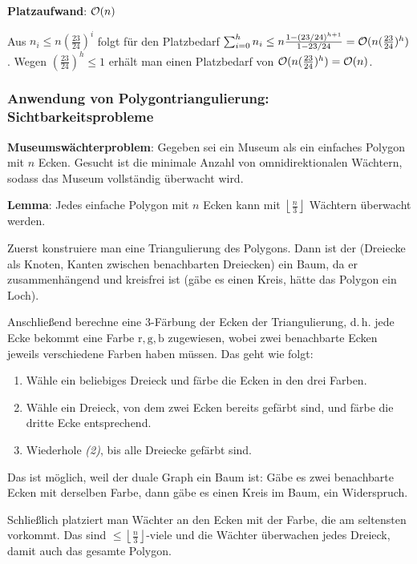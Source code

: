 \textbf{Platzaufwand}:
$\mathcal{O}(n)$

\begin{Beweis}
    Aus $n_i \le n (\frac{23}{24})^i$ folgt für den Platzbedarf
    $\sum_{i=0}^{h} n_i
    \le n \frac{1 - (23/24)^{h+1}}{1 - 23/24}
    = \mathcal{O}(n (\frac{23}{24})^h)$.
    Wegen $(\frac{23}{24})^h \le 1$
    erhält man einen Platzbedarf von $\mathcal{O}(n (\frac{23}{24})^h) = \mathcal{O}(n)$.
\end{Beweis}

\subsubsection{%
    Anwendung von Polygontriangulierung: Sichtbarkeitsprobleme%
}

\textbf{Museumswächterproblem}:
Gegeben sei ein Museum als ein einfaches Polygon mit $n$ Ecken.
Gesucht ist die minimale Anzahl von omnidirektionalen Wächtern, sodass das Museum vollständig
überwacht wird.

\textbf{Lemma}:
Jedes einfache Polygon mit $n$ Ecken kann mit
$\left\lfloor \frac{n}{3} \right\rfloor$ Wächtern überwacht werden.

\begin{Beweis}
    Zuerst konstruiere man eine Triangulierung des Polygons.
    Dann ist der 
    (Dreiecke als Knoten, Kanten zwischen benachbarten Dreiecken) ein Baum,
    da er zusammenhängend und kreisfrei ist
    (gäbe es einen Kreis, hätte das Polygon ein Loch).
    
    Anschließend berechne eine $3$-Färbung der Ecken der Triangulierung,
    d.\,h. jede Ecke bekommt eine Farbe $\text{r}, \text{g}, \text{b}$ zugewiesen,
    wobei zwei benachbarte Ecken jeweils verschiedene Farben haben müssen.
    Das geht wie folgt:
    \begin{enumerate}
        \item
        Wähle ein beliebiges Dreieck und färbe die Ecken in den drei Farben.
        
        \item
        Wähle ein Dreieck, von dem zwei Ecken bereits gefärbt sind, und färbe die dritte Ecke
        entsprechend.
        
        \item
        Wiederhole \emph{(2)}, bis alle Dreiecke gefärbt sind.
    \end{enumerate}
    Das ist möglich, weil der duale Graph ein Baum ist:
    Gäbe es zwei benachbarte Ecken mit derselben Farbe, dann gäbe es einen Kreis im Baum,
    ein Widerspruch.
    
    Schließlich platziert man Wächter an den Ecken mit der Farbe, die am seltensten vorkommt.
    Das sind $\le \left\lfloor \frac{n}{3} \right\rfloor$-viele und die Wächter überwachen
    jedes Dreieck, damit auch das gesamte Polygon.
\end{Beweis}

